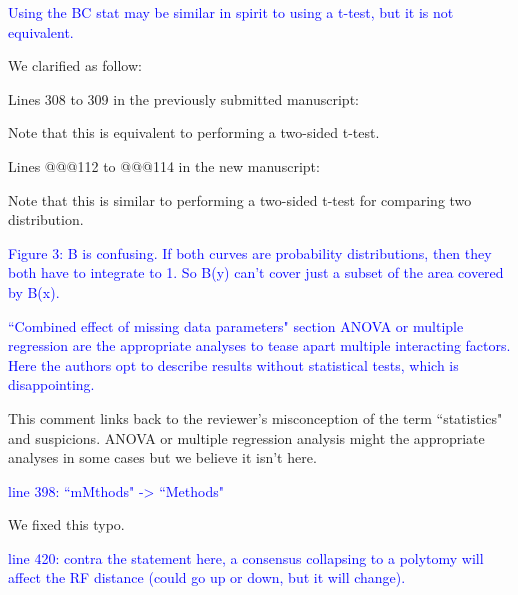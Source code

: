 \documentclass[11pt]{letter}
\begin{document}
\begin{letter}{}


\textcolor{blue}{Using the BC stat may be similar in spirit to using a t-test, but it is not equivalent.}

We clarified as follow:

Lines 308 to 309 in the previously submitted manuscript:

\hfill\begin{minipage}{\dimexpr\textwidth-1cm}
Note that this is equivalent to performing a two-sided t-test.
\end{minipage}

Lines @@@112 to @@@114 in the new manuscript:

\hfill\begin{minipage}{\dimexpr\textwidth-1cm}
Note that this is similar to performing a two-sided t-test for comparing two distribution.
\end{minipage}


\textcolor{blue}{Figure 3: B is confusing. If both curves are probability distributions, then they both have to integrate to 1. So B(y) can't cover just a subset of the area covered by B(x).}



\textcolor{blue}{``Combined effect of missing data parameters" section ANOVA or multiple regression are the appropriate analyses to tease apart multiple interacting factors. Here the authors opt to describe results without statistical tests, which is disappointing.}

This comment links back to the reviewer's misconception of the term ``statistics" and suspicions. ANOVA or multiple regression analysis might the appropriate analyses in some cases but we believe it isn't here. %


\textcolor{blue}{line 398: ``mMthods" -> ``Methods"}

We fixed this typo.

\textcolor{blue}{line 420: contra the statement here, a consensus collapsing to a polytomy will affect the RF distance (could go up or down, but it will change).}



\end{letter}
\end{document}
